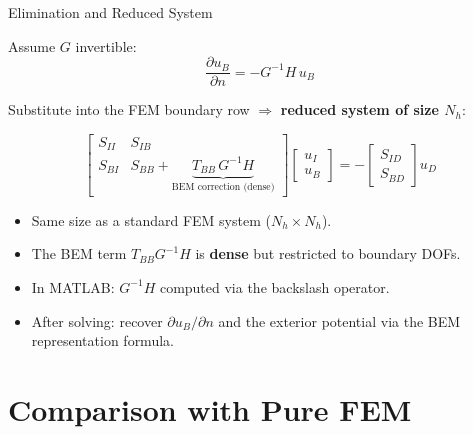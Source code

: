 \documentclass[aspectratio=169]{beamer}
\begin{document}
\begin{frame}{Elimination and Reduced System}

  Assume $G$ invertible:
  \[
    \frac{\partial u_B}{\partial n} = -G^{-1}H\,u_B
  \]

  Substitute into the FEM boundary row $\Rightarrow$ \textbf{reduced system of size $N_h$}:

  \[
    \begin{bmatrix}
      S_{II} & S_{IB} \\[4pt]
      S_{BI} & S_{BB} + \underbrace{T_{BB}\,G^{-1}H}_{\text{BEM correction (dense)}}
    \end{bmatrix}
    \begin{bmatrix} u_I \\[4pt] u_B \end{bmatrix}
    =
    -\begin{bmatrix} S_{ID} \\ S_{BD} \end{bmatrix} u_D
  \]

  \begin{itemize}
    \item Same size as a standard FEM system ($N_h \times N_h$).
    \item The BEM term $T_{BB}G^{-1}H$ is \textbf{dense} but restricted to boundary DOFs.
    \item In MATLAB: $G^{-1}H$ computed via the backslash operator.
    \item After solving: recover $\partial u_B/\partial n$ and the exterior potential via
          the BEM representation formula.
  \end{itemize}

\end{frame}

\section{Comparison with Pure FEM}
\end{document}
